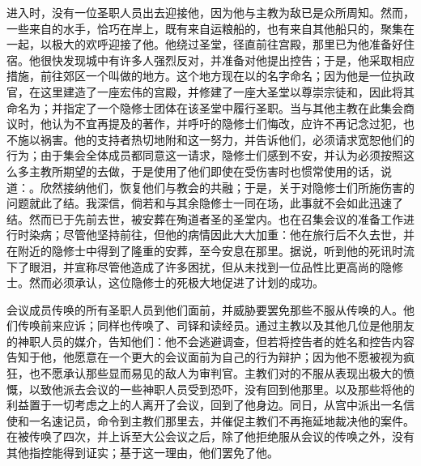 进入时，没有一位圣职人员出去迎接他，因为他与主教为敌已是众所周知。然而，一些来自的水手，恰巧在岸上，既有来自运粮船的，也有来自其他船只的，聚集在一起，以极大的欢呼迎接了他。他绕过圣堂，径直前往宫殿，那里已为他准备好住宿。他很快发现城中有许多人强烈反对，并准备对他提出控告；于是，他采取相应措施，前往郊区一个叫做的地方。这个地方现在以的名字命名；因为他是一位执政官，在这里建造了一座宏伟的宫殿，并修建了一座大圣堂以尊崇宗徒和，因此将其命名为；并指定了一个隐修士团体在该圣堂中履行圣职。当与其他主教在此集会商议时，他认为不宜再提及的著作，并呼吁的隐修士们悔改，应许不再记念过犯，也不施以祸害。他的支持者热切地附和这一努力，并告诉他们，必须请求宽恕他们的行为；由于集会全体成员都同意这一请求，隐修士们感到不安，并认为必须按照这么多主教所期望的去做，于是使用了他们即使在受伤害时也惯常使用的话，说道：。欣然接纳他们，恢复他们与教会的共融；于是，关于对隐修士们所施伤害的问题就此了结。我深信，倘若和与其余隐修士一同在场，此事就不会如此迅速了结。然而已于先前去世，被安葬在殉道者圣的圣堂内。也在召集会议的准备工作进行时染病；尽管他坚持前往，但他的病情因此大大加重：他在旅行后不久去世，并在附近的隐修士中得到了隆重的安葬，至今安息在那里。据说，听到他的死讯时流下了眼泪，并宣称尽管他造成了许多困扰，但从未找到一位品性比更高尚的隐修士。然而必须承认，这位隐修士的死极大地促进了计划的成功。\par

会议成员传唤的所有圣职人员到他们面前，并威胁要罢免那些不服从传唤的人。他们传唤前来应诉；同样也传唤了、司铎和读经员。通过主教以及其他几位是他朋友的神职人员的媒介，告知他们：他不会逃避调查，但若将控告者的姓名和控告内容告知于他，他愿意在一个更大的会议面前为自己的行为辩护；因为他不愿被视为疯狂，也不愿承认那些显而易见的敌人为审判官。主教们对的不服从表现出极大的愤慨，以致他派去会议的一些神职人员受到恐吓，没有回到他那里。以及那些将他的利益置于一切考虑之上的人离开了会议，回到了他身边。同日，从宫中派出一名信使和一名速记员，命令到主教们那里去，并催促主教们不再拖延地裁决他的案件。在被传唤了四次，并上诉至大公会议之后，除了他拒绝服从会议的传唤之外，没有其他指控能得到证实；基于这一理由，他们罢免了他。\par


